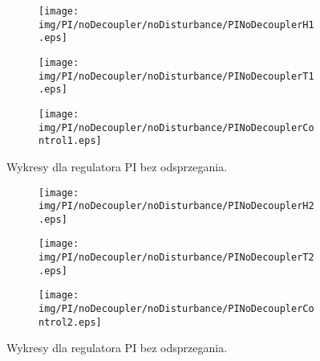 \begin{figure}[h!]
   \centering
   \begin{subfigure}[b]{0.4\textwidth}
      \texttt{[image: img/PI/noDecoupler/noDisturbance/PINoDecouplerH1.eps]}
      \caption{}
      \label{fig:fig:PINodDecoupler11}
   \end{subfigure}
       
   \begin{subfigure}[b]{0.4\textwidth}
      \texttt{[image: img/PI/noDecoupler/noDisturbance/PINoDecouplerT1.eps]}
      \caption{}
      \label{fig:fig:PINodDecoupler12}
   \end{subfigure}
       
   \begin{subfigure}[b]{0.4\textwidth}
      \texttt{[image: img/PI/noDecoupler/noDisturbance/PINoDecouplerControl1.eps]}
      \caption{}
      \label{fig:fig:PINodDecoupler13}
   \end{subfigure}
       
   \caption{Wykresy dla regulatora PI bez odsprzegania.}
   \label{fig:PINodDecoupler1}
\end{figure}
           
\begin{figure}[h!]
   \centering
   \begin{subfigure}[b]{0.4\textwidth}
      \texttt{[image: img/PI/noDecoupler/noDisturbance/PINoDecouplerH2.eps]}
      \caption{}
      \label{fig:fig:PINodDecoupler21}
   \end{subfigure}
       
   \begin{subfigure}[b]{0.4\textwidth}
      \texttt{[image: img/PI/noDecoupler/noDisturbance/PINoDecouplerT2.eps]}
      \caption{}
      \label{fig:fig:PINodDecoupler22}
   \end{subfigure}
       
   \begin{subfigure}[b]{0.4\textwidth}
      \texttt{[image: img/PI/noDecoupler/noDisturbance/PINoDecouplerControl2.eps]}
      \caption{}
      \label{fig:fig:PINodDecoupler23}
   \end{subfigure}
       
   \caption{Wykresy dla regulatora PI bez odsprzegania.}
   \label{fig:PINodDecoupler2}
\end{figure}
           

